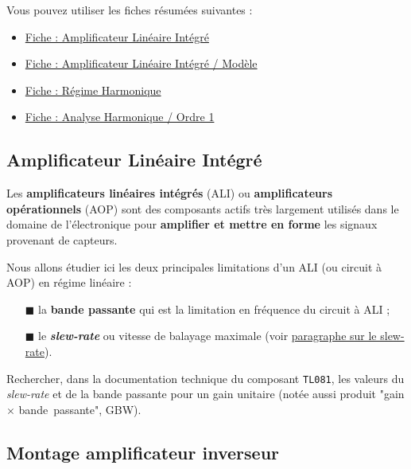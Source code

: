 Vous pouvez utiliser les fiches résumées suivantes : 

\begin{itemize}
	\item \hyperref[fiche:ALI]{Fiche : Amplificateur Linéaire Intégré}
	\item \hyperref[fiche:ALIModele]{Fiche : Amplificateur Linéaire Intégré / Modèle}
	\item \hyperref[fiche:RegimeHarmonique]{Fiche : Régime Harmonique}
	\item \hyperref[fiche:AnHaOrdre1]{Fiche : Analyse Harmonique / Ordre 1}
\end{itemize}



\subsection{Amplificateur Linéaire Intégré}

Les \textbf{amplificateurs linéaires intégrés} (ALI) ou \textbf{amplificateurs opérationnels} (AOP) sont des composants actifs très largement utilisés dans le domaine de l'électronique pour \textbf{amplifier et mettre en forme} les signaux provenant de capteurs. 

\medskip

Nous allons étudier ici les deux principales limitations d'un ALI (ou circuit à AOP) en régime linéaire :

\begin{itemize}
	\item[\scriptsize$\blacksquare$] la \textbf{bande passante} qui est la limitation en fréquence du circuit à ALI ;	
	\item[\scriptsize$\blacksquare$] le \textbf{\textit{slew-rate}} ou vitesse de balayage maximale (voir \hyperref[parslewrate]{paragraphe sur le slew-rate}).
\end{itemize}

\medskip


 
\Quest Rechercher, dans la documentation technique du composant \texttt{TL081}, les valeurs du \textit{slew-rate} et de la bande passante pour un gain unitaire (notée aussi produit "gain $\times$ bande~passante", GBW).

\subsection{Montage amplificateur inverseur}

